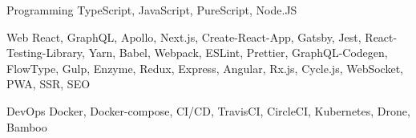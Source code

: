 

\begin{cvskills}

  \cvskill
    {Programming} %
    {TypeScript, JavaScript, PureScript, Node.JS} %

  \cvskill
    {Web} %
    {React, GraphQL, Apollo, Next.js, Create-React-App, Gatsby, Jest, React-Testing-Library, Yarn, Babel, Webpack, ESLint, Prettier, GraphQL-Codegen, FlowType, Gulp, Enzyme, Redux, Express, Angular, Rx.js, Cycle.js, WebSocket, PWA, SSR, SEO} %

  \cvskill
    {DevOps} %
    {Docker, Docker-compose, CI/CD, TravisCI, CircleCI, Kubernetes, Drone, Bamboo} %


\end{cvskills}
